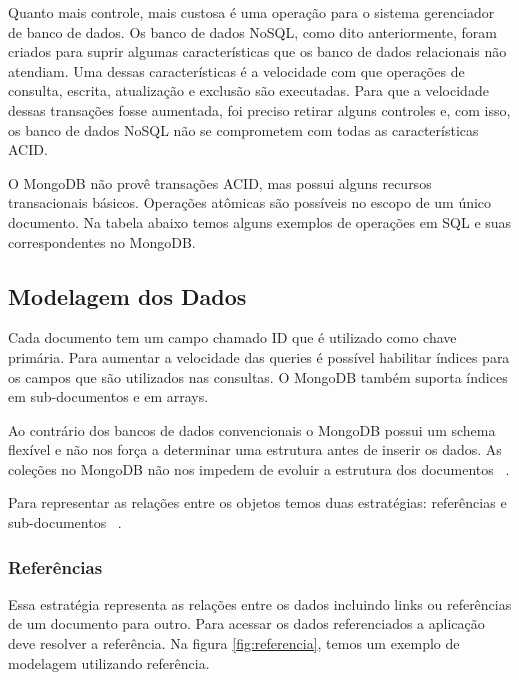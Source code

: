 Quanto mais controle, mais custosa é uma operação para o sistema gerenciador de banco de dados.  Os banco de dados NoSQL, como dito anteriormente, foram criados para suprir algumas características que os banco de dados relacionais não atendiam. Uma dessas características é a velocidade com que operações de consulta, escrita, atualização e exclusão são executadas.  Para que a velocidade dessas transações fosse aumentada, foi preciso retirar alguns controles e, com isso, os banco de dados NoSQL não se comprometem com todas as características ACID.

O MongoDB não provê transações ACID, mas possui alguns recursos transacionais básicos. Operações atômicas são possíveis no escopo de um único documento. Na tabela abaixo temos alguns exemplos de operações em SQL e suas correspondentes no MongoDB.

\subsection{Modelagem dos Dados}

Cada documento tem um campo chamado ID que é utilizado como chave primária. Para aumentar a velocidade das queries é possível habilitar índices para os campos que são utilizados nas consultas. O MongoDB também suporta índices em sub-documentos e em arrays.

Ao contrário dos bancos de dados convencionais o MongoDB possui um schema flexível e não nos força a determinar uma estrutura antes de inserir os dados. As coleções no MongoDB não nos impedem de evoluir a estrutura dos documentos ~\cite{Orendanalysisand}.

Para representar as relações entre os objetos temos duas estratégias: referências e sub-documentos ~\cite{Orendanalysisand}.

\subsubsection{Referências}

Essa estratégia representa as relações entre os dados incluindo links ou referências de um documento para outro. Para acessar os dados referenciados a aplicação deve resolver a referência. Na figura \ref{fig:referencia}, temos um exemplo de modelagem utilizando referência.


